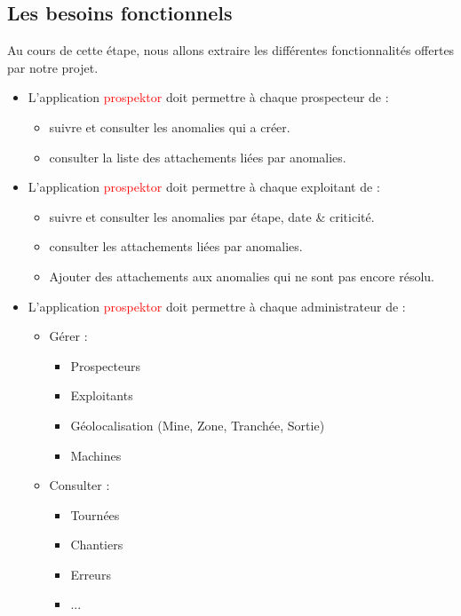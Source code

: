 \subsection{Les besoins fonctionnels}
Au cours de cette \'etape, nous allons extraire les diff\'erentes fonctionnalit\'es offertes par notre projet.
\begin{itemize}
\item L'application \textcolor{red}{prospektor} doit permettre \`a chaque prospecteur de :
\begin{itemize}
\item suivre et consulter les anomalies qui a cr\'eer.
\item consulter la liste des attachements li\'ees par anomalies.
\end{itemize}
\item L'application \textcolor{red}{prospektor} doit permettre \`a chaque exploitant de :
\begin{itemize}
\item suivre et consulter les anomalies par \'etape, date \& criticit\'e.
\item consulter les attachements li\'ees par anomalies.
\item Ajouter des attachements aux anomalies qui ne sont pas encore r\'esolu.
\end{itemize}  
\item L'application \textcolor{red}{prospektor} doit permettre \`a chaque administrateur de :
\begin{itemize}
\item G\'erer :
\begin{itemize}
\item Prospecteurs
\item Exploitants
\item G\'eolocalisation (Mine, Zone, Tranch\'ee, Sortie)
\item Machines
\end{itemize}
\item Consulter :
\begin{itemize}
\item Tourn\'ees
\item Chantiers
\item Erreurs
\item ...
\end{itemize}

\end{itemize} 
 
\end{itemize}

